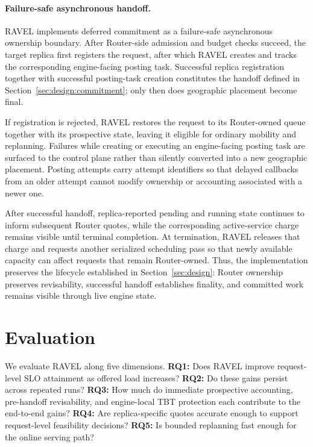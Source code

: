 \documentclass[letterpaper,twocolumn,10pt]{article}
\begin{document}
\paragraph{Failure-safe asynchronous handoff.}
RAVEL implements deferred commitment as a failure-safe asynchronous ownership
boundary.
After Router-side admission and budget checks succeed, the target replica first
registers the request, after which RAVEL creates and tracks the corresponding
engine-facing posting task.
Successful replica registration together with successful posting-task creation
constitutes the handoff defined in
Section~\ref{sec:design:commitment}; only then does geographic placement become
final.

If registration is rejected, RAVEL restores the request to its Router-owned
queue together with its prospective state, leaving it eligible for ordinary
mobility and replanning.
Failures while creating or executing an engine-facing posting task are surfaced
to the control plane rather than silently converted into a new geographic
placement.
Posting attempts carry attempt identifiers so that delayed callbacks from an
older attempt cannot modify ownership or accounting associated with a newer
one.

After successful handoff, replica-reported pending and running state continues
to inform subsequent Router quotes, while the corresponding active-service
charge remains visible until terminal completion.
At termination, RAVEL releases that charge and requests another serialized
scheduling pass so that newly available capacity can affect requests that remain
Router-owned.
Thus, the implementation preserves the lifecycle established in
Section~\ref{sec:design}: Router ownership preserves revisability, successful
handoff establishes finality, and committed work remains visible through live
engine state.
\section{Evaluation}
\label{sec:evaluation}

We evaluate RAVEL along five dimensions.
\textbf{RQ1:} Does RAVEL improve request-level SLO attainment as offered load
increases?
\textbf{RQ2:} Do these gains persist across repeated runs?
\textbf{RQ3:} How much do immediate prospective accounting, pre-handoff
revisability, and engine-local TBT protection each contribute to the
end-to-end gains?
\textbf{RQ4:} Are replica-specific quotes accurate enough to support
request-level feasibility decisions?
\textbf{RQ5:} Is bounded replanning fast enough for the online serving path?
\end{document}
